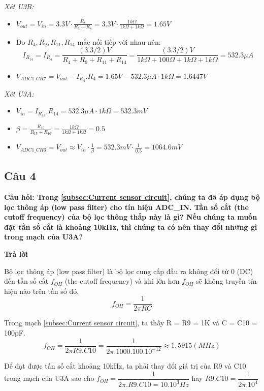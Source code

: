 \textit{Xét U3B:}
\begin{itemize}
    \item $V_{out} = V_{in} = 3.3V \cdot \frac{R_8}{R_5 + R_8} = 3.3V \cdot \frac{1k\Omega}{1k\Omega + 1k\Omega} = 1.65V$
    \item Do $R_4, R_9, R_{11}, R_{14}$ mắc nối tiếp với nhau nên: \[I_{R_{14}} = I_{R_4} = \frac{(3.3 / 2) V}{R_4 + R_9 + R_{11} + R_{14}} = \frac{(3.3 / 2) V}{1k\Omega + 100\Omega + 1k\Omega + 1k\Omega} = 532.3 \mu A \]
    \item $V_{ADC1\_CH7} = V_{out} - I_{R_4}.R_4 = 1.65V  - 532.3 \mu A \cdot 1k\Omega = 1.6447V$
\end{itemize}
\textit{Xét U3A:}
\begin{itemize}
    \item $V_{in} = I_{R_{14}}.R_{14} = 532.3 \mu A \cdot 1k\Omega = 532.3mV$
    \item $\beta = \frac{R_{15}}{R_{15} + R_{16}} = \frac{1k\Omega}{1k\Omega + 1k\Omega} = 0.5$
    \item $V_{ADC1\_CH6} = V_{out} \approx V_{in} \cdot \frac{1}{\beta} = 532.3mV \cdot \frac{1}{0.5} = 1064.6mV$
\end{itemize}

\subsection{Câu 4}
\textbf{Câu hỏi: Trong \ref{subsec:Current sensor circuit}, chúng ta đã áp dụng bộ lọc thông áp (low pass filter) cho tín hiệu ADC\_IN. Tần số cắt (the cutoff frequency) của bộ lọc thông thấp này là gì? Nếu chúng ta muốn đặt tần số cắt là khoảng 10kHz, thì
chúng ta có nên thay đổi những gì trong mạch của U3A?}

\textbf{Trả lời}

Bộ lọc thông áp (low pass filter) là bộ lọc cung cấp đầu ra không đổi từ 0 (DC) đến tần số cắt $f_{OH}$ (the cutoff frequency) và khi lớn hơn $f_{OH}$ sẽ
không truyền tín hiệu nào trên tần số đó.
\[f_{OH} = \dfrac{1}{2\pi RC}\]

Trong mạch \ref{subsec:Current sensor circuit}, ta thấy R = R9 = 1K và C = C10 = 100pF.
\[f_{OH} = \dfrac{1}{2\pi R9.C10} = \dfrac{1}{2\pi .1000.100.10^{-12}} \approx 1,5915 (MHz)\]

Để đạt được tần số cắt khoảng 10kHz, ta phải thay đổi giá trị của R9 và C10 trong mạch của U3A sao cho $ f_{OH} = \dfrac{1}{2\pi.R9.C10 = 10.10^3 Hz}$ hay $ R9.C10 = \dfrac{1}{2\pi.10^4}$

